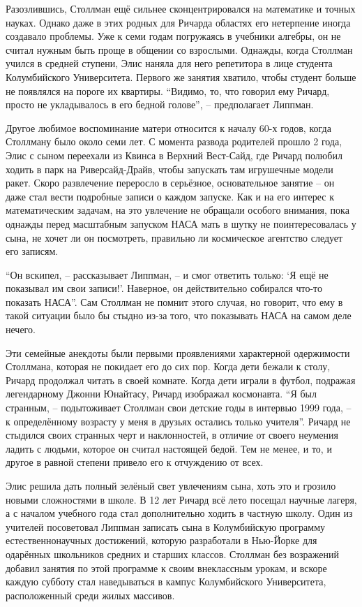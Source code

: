 Разозлившись, Столлман ещё сильнее сконцентрировался на математике и точных науках. Однако даже в этих родных для Ричарда областях его нетерпение иногда создавало проблемы. Уже к семи годам погружаясь в учебники алгебры, он не считал нужным быть проще в общении со взрослыми. Однажды, когда Столлман учился в средней ступени, Элис наняла для него репетитора в лице студента Колумбийского Университета. Первого же занятия хватило, чтобы студент больше не появлялся на пороге их квартиры. \enquote{Видимо, то, что говорил ему Ричард, просто не укладывалось в его бедной голове}, -- предполагает Липпман.

Другое любимое воспоминание матери относится к началу 60-х годов, когда Столлману было около семи лет. С момента развода родителей прошло 2 года, Элис с сыном переехали из Квинса в Верхний Вест-Сайд, где Ричард полюбил ходить в парк на Риверсайд-Драйв, чтобы запускать там игрушечные модели ракет. Скоро развлечение переросло в серьёзное, основательное занятие -- он даже стал вести подробные записи о каждом запуске. Как и на его интерес к математическим задачам, на это увлечение не обращали особого внимания, пока однажды перед масштабным запуском НАСА мать в шутку не поинтересовалась у сына, не хочет ли он посмотреть, правильно ли космическое агентство следует его записям.

\enquote{Он вскипел, -- рассказывает Липпман, -- и смог ответить только: \enquote{Я ещё не показывал им свои записи!}. Наверное, он действительно собирался что-то показать НАСА}. Сам Столлман не помнит этого случая, но говорит, что ему в такой ситуации было бы стыдно из-за того, что показывать НАСА на самом деле нечего.

Эти семейные анекдоты были первыми проявлениями характерной одержимости Столлмана, которая не покидает его до сих пор. Когда дети бежали к столу, Ричард продолжал читать в своей комнате. Когда дети играли в футбол, подражая легендарному Джонни Юнайтасу, Ричард изображал космонавта. \enquote{Я был странным, -- подытоживает Столлман свои детские годы в интервью 1999 года, -- к определённому возрасту у меня в друзьях остались только учителя}. Ричард не стыдился своих странных черт и наклонностей, в отличие от своего неумения ладить с людьми, которое он считал настоящей бедой. Тем не менее, и то, и другое в равной степени привело его к отчуждению от всех.

Элис решила дать полный зелёный свет увлечениям сына, хоть это и грозило новыми сложностями в школе. В 12 лет Ричард всё лето посещал научные лагеря, а с началом учебного года стал дополнительно ходить в частную школу. Один из учителей посоветовал Липпман записать сына в Колумбийскую программу естественнонаучных достижений, которую разработали в Нью-Йорке для одарённых школьников средних и старших классов. Столлман без возражений добавил занятия по этой программе к своим внеклассным урокам, и вскоре каждую субботу стал наведываться в кампус Колумбийского Университета, расположенный среди жилых массивов.

